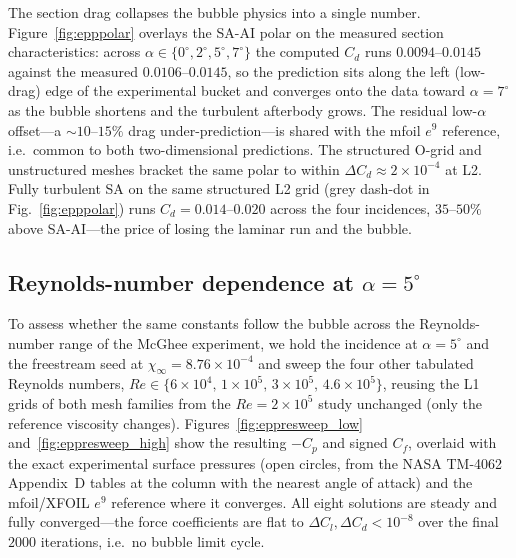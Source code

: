 \documentclass[journal]{new-aiaa}
\begin{document}
The section drag collapses the bubble physics into a single number.
Figure~\ref{fig:epppolar} overlays the SA-AI polar on the measured section
characteristics: across $\alpha\!\in\!\{0^\circ,2^\circ,5^\circ,7^\circ\}$ the
computed $C_d$ runs $0.0094$--$0.0145$ against the measured $0.0106$--$0.0145$,
so the prediction sits along the left (low-drag) edge of the experimental bucket
and converges onto the data toward $\alpha\!=\!7^\circ$ as the bubble shortens
and the turbulent afterbody grows. The residual low-$\alpha$ offset---a
$\sim\!10$--$15\%$ drag under-prediction---is shared with the mfoil $e^9$
reference, i.e.\ common to both two-dimensional predictions. The structured
O-grid and unstructured meshes bracket the same polar to within
$\Delta C_d\!\approx\!2\times10^{-4}$ at L2. Fully turbulent SA on the same
structured L2 grid (grey dash-dot in Fig.~\ref{fig:epppolar}) runs
$C_d\!=\!0.014$--$0.020$ across the four incidences, $35$--$50\%$ above
SA-AI---the price of losing the laminar run and the bubble.

\subsection{Reynolds-number dependence at $\alpha\!=\!5^\circ$}\label{sec:eppresweep}

To assess whether the same constants follow the bubble across the
Reynolds-number range of the McGhee experiment, we hold the incidence at
$\alpha\!=\!5^\circ$ and the freestream seed at
$\chi_\infty\!=\!8.76\!\times\!10^{-4}$ and sweep the four other tabulated
Reynolds numbers,
$Re\!\in\!\{6\!\times\!10^4,\,1\!\times\!10^5,\,3\!\times\!10^5,\,4.6\!\times\!10^5\}$,
reusing the L1 grids of both mesh families from the $Re\!=\!2\!\times\!10^5$
study unchanged (only the reference viscosity changes).
Figures~\ref{fig:eppresweep_low} and~\ref{fig:eppresweep_high} show the resulting
$-C_p$ and signed $C_f$, overlaid with the exact experimental surface pressures
(open circles, from the NASA TM-4062 Appendix~D tables at the column with the
nearest angle of attack) and the mfoil/XFOIL $e^9$ reference where it converges.
All eight solutions are steady and fully converged---the force coefficients are
flat to $\Delta C_l,\Delta C_d\!<\!10^{-8}$ over the final $2000$ iterations,
i.e.\ no bubble limit cycle.
\end{document}

